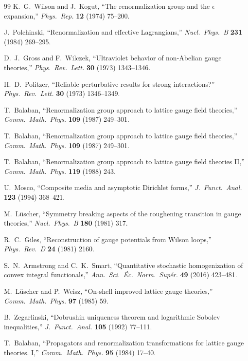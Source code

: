 \begin{thebibliography}{99}
K.~G.~Wilson and J.~Kogut, ``The renormalization group and the $\epsilon$ expansion,'' 
\textit{Phys.\ Rep.} \textbf{12} (1974) 75--200.

J.~Polchinski, ``Renormalization and effective Lagrangians,'' 
\textit{Nucl.\ Phys.\ B} \textbf{231} (1984) 269--295.

D.~J.~Gross and F.~Wilczek, ``Ultraviolet behavior of non-Abelian gauge theories,'' 
\textit{Phys.\ Rev.\ Lett.} \textbf{30} (1973) 1343--1346.

H.~D.~Politzer, ``Reliable perturbative results for strong interactions?'' 
\textit{Phys.\ Rev.\ Lett.} \textbf{30} (1973) 1346--1349.

T.~Balaban, ``Renormalization group approach to lattice gauge field theories,'' 
\textit{Comm.\ Math.\ Phys.} \textbf{109} (1987) 249--301.

T.~Balaban, ``Renormalization group approach to lattice gauge field theories,'' 
\textit{Comm.\ Math.\ Phys.} \textbf{109} (1987) 249--301.

T.~Balaban, ``Renormalization group approach to lattice gauge field theories II,'' 
\textit{Comm.\ Math.\ Phys.} \textbf{119} (1988) 243.

U.~Mosco, ``Composite media and asymptotic Dirichlet forms,'' 
\textit{J.\ Funct.\ Anal.} \textbf{123} (1994) 368--421.

M.~L\"uscher, ``Symmetry breaking aspects of the roughening transition in gauge theories,''
\textit{Nucl.\ Phys.\ B} \textbf{180} (1981) 317.

R.~C.~Giles, ``Reconstruction of gauge potentials from Wilson loops,'' 
\textit{Phys.\ Rev.\ D} \textbf{24} (1981) 2160.

S.~N.~Armstrong and C.~K.~Smart, ``Quantitative stochastic homogenization of convex integral functionals,''
\textit{Ann.\ Sci.\ \'Ec.\ Norm.\ Sup\'er.} \textbf{49} (2016) 423--481.

M.~L\"uscher and P.~Weisz, ``On-shell improved lattice gauge theories,''
\textit{Comm.\ Math.\ Phys.} \textbf{97} (1985) 59.

B.~Zegarlinski, ``Dobrushin uniqueness theorem and logarithmic Sobolev inequalities,''
\textit{J.\ Funct.\ Anal.} \textbf{105} (1992) 77--111.

T.~Balaban, ``Propagators and renormalization transformations for lattice gauge theories. I,''
\textit{Comm.\ Math.\ Phys.} \textbf{95} (1984) 17--40.


\end{thebibliography}
